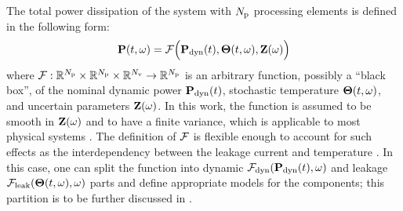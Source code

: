 The total power dissipation of the system with ${N_\text{p}}$ processing elements is defined in the following form:
\begin{equation} \elabel{power-model}
  \vP(\t, \o) = \f\Big(\vP_\dyn(\t), \vTO(\t, \o), \vZ(\o)\Big)
\end{equation}
where $\mathcal{F}: \mathbb{R}^{N_\text{p}} \times \mathbb{R}^{N_\text{p}} \times \mathbb{R}^{N_\text{v}} \to \mathbb{R}^{N_\text{p}}$ is an arbitrary function, possibly a ``black box'', of the nominal dynamic power $\mathbf{P}_{\text{dyn}}(t)$, stochastic temperature ${\boldsymbol\Theta}(t, \omega)$, and uncertain parameters $\mathbf{Z}(\omega)$. In this work, the function is assumed to be smooth in $\mathbf{Z}(\omega)$ and to have a finite variance, which is applicable to most physical systems \cite{xiu2002}. The definition of $\mathcal{F}$ is flexible enough to account for such effects as the interdependency between the leakage current and temperature \cite{liu2007, srivastava2010}. In this case, one can split the function into dynamic $\mathcal{F}_{\text{dyn}}(\mathbf{P}_{\text{dyn}}(t), \omega)$ and leakage $\mathcal{F}_{\text{leak}}({\boldsymbol\Theta}(t, \omega), \omega)$ parts and define appropriate models for the components; this partition is to be further discussed in .
